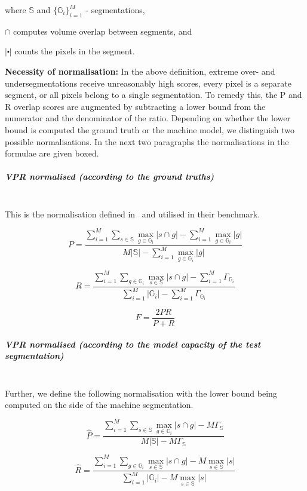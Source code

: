 where $\mathbb{S}$ and $\{\mathbb{G}_{i}\}_{i=1}^{M}$ - segmentations,

$\cap$ computes volume overlap between segments, and 

$\left|\centerdot\right|$ counts the pixels in the segment.%

\textbf{Necessity of normalisation:} In the above definition, extreme over- and undersegmentations receive unreasonably high scores, \ie every pixel is a separate segment, or all pixels belong to a single segmentation. To remedy this, the P and R overlap scores are augmented by subtracting a lower bound from the numerator and the denominator of the ratio. Depending on whether the lower bound is computed \wrt the ground truth or the machine model, we distinguish two possible normalisations. In the next two paragraphs the normalisations in the formulae are given boxed.

\subparagraph{VPR normalised (according to the ground truths)}\mbox{}\\ %
This is the normalisation defined in~\cite{Galasso13} and utilised %
in their benchmark.

\[
P=\frac{\sum\limits _{i=1}^{M}\sum\limits _{s\in\mathbb{S}}\max\limits _{g\in\mathbb{G}_{i}}\left|s\cap g\right|-\boxed{\sum\limits _{i=1}^{M}\max\limits _{g\in\mathbb{G}_{i}}\left|g\right|}}{M\left|\mathbb{S}\right|-\boxed{\sum\limits _{i=1}^{M}\max\limits _{g\in\mathbb{G}_{i}}\left|g\right|}}
\]

\[
R=\frac{\sum\limits _{i=1}^{M}\sum\limits _{g\in\mathbb{G}_{i}}\max\limits _{s\in\mathbb{S}}\left|s\cap g\right|-\boxed{\sum\limits _{i=1}^{M}\Gamma_{\mathbb{G}_{i}}}}{\sum\limits _{i=1}^{M}\left|\mathbb{G}_{i}\right|-\boxed{\sum\limits _{i=1}^{M}\Gamma_{\mathbb{G}_{i}}}}
\]

\[
F=\frac{2PR}{P+R}
\]

\subparagraph{VPR normalised (according to the model capacity of the test segmentation)}\mbox{}\\ %
Further, we define the following normalisation with the lower bound being computed on the side of the machine segmentation.

\[
\hat{P}=\frac{\sum\limits _{i=1}^{M}\sum\limits _{s\in\mathbb{S}}\max\limits _{g\in\mathbb{G}_{i}}\left|s\cap g\right|-\boxed{M\Gamma_{\mathbb{S}}}}{M\left|\mathbb{S}\right|-\boxed{M\Gamma_{\mathbb{S}}}}
\]

\[
\hat{{R}}=\frac{\sum\limits _{i=1}^{M}\sum\limits _{g\in\mathbb{G}_{i}}\max\limits _{s\in\mathbb{S}}\left|s\cap g\right|-\boxed{M\max_{s\in\mathbb{S}}\left|s\right|}}{\sum\limits _{i=1}^{M}\left|\mathbb{G}_{i}\right|-\boxed{M\max_{s\in\mathbb{S}}\left|s\right|}}
\]

